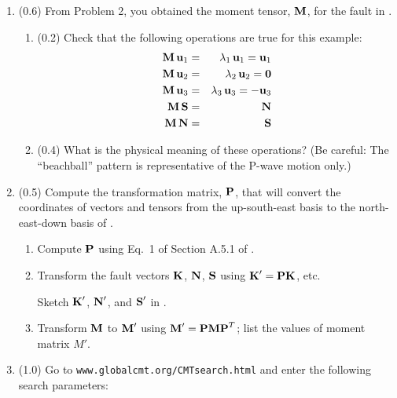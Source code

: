 \documentclass[11pt,titlepage,fleqn]{article}
\begin{document}
\begin{enumerate}

\item (0.6) From Problem 2, you obtained the moment tensor, $\mbox{${\bf M}$}$, for the fault in .

\begin{enumerate}
\item (0.2) Check that the following operations are true for this example:
%
\begin{eqnarray*}
\mbox{${\bf M}$} \, \mbox{${\bf u}$}_1 &=& \lambda_1 \, \mbox{${\bf u}$}_1 = \mbox{${\bf u}$}_1
\\
\mbox{${\bf M}$} \, \mbox{${\bf u}$}_2 &=& \lambda_2 \, \mbox{${\bf u}$}_2 = \mbox{${\bf 0}$}
\\
\mbox{${\bf M}$} \, \mbox{${\bf u}$}_3 &=& \lambda_3 \, \mbox{${\bf u}$}_3 = -\mbox{${\bf u}$}_3
\\
\mbox{${\bf M}$} \, \mbox{${\bf S}$} &=& \mbox{${\bf N}$}
\\
\mbox{${\bf M}$} \, \mbox{${\bf N}$} &=& \mbox{${\bf S}$}
\end{eqnarray*}

\item (0.4) What is the physical meaning of these operations? (Be careful: The ``beachball'' pattern is representative of the P-wave motion only.)

\end{enumerate}


\item (0.5) Compute the transformation matrix, $\mbox{${\bf P}$}$, that will convert the coordinates of vectors and tensors from the up-south-east basis to the north-east-down basis of \citet{AkiRichardsE2}.
%
\begin{enumerate}
\item Compute $\mbox{${\bf P}$}$ using Eq.~1 of Section A.5.1 of \cite{SteinWysession}.

\item Transform the fault vectors $\mbox{${\bf K}$}$, $\mbox{${\bf N}$}$, $\mbox{${\bf S}$}$ using $\mbox{${\bf K}$}' = \mbox{${\bf P}$}\mbox{${\bf K}$}$, etc.

Sketch $\mbox{${\bf K}$}'$, $\mbox{${\bf N}$}'$, and $\mbox{${\bf S}$}'$ in .

\item Transform $\mbox{${\bf M}$}$ to $\mbox{${\bf M}$}'$ using $\mbox{${\bf M}$}' = \mbox{${\bf P}$} \mbox{${\bf M}$} \mbox{${\bf P}$}^T$; list the values of moment matrix $M'$.
\end{enumerate}


\item (1.0) Go to \verb+www.globalcmt.org/CMTsearch.html+ and enter the following search parameters:


\end{enumerate}
\end{document}
